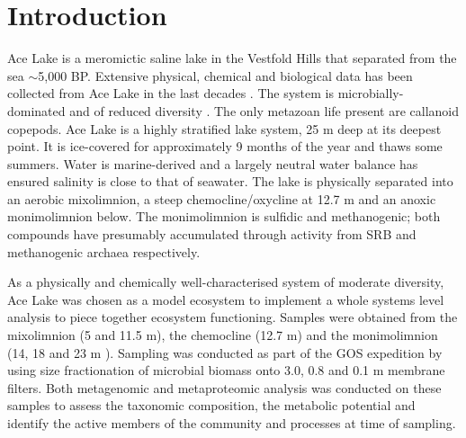 \section{Introduction}
Ace Lake is a meromictic saline lake in the Vestfold Hills that separated from the sea $\sim$5,000 BP. %
Extensive physical, chemical and biological data has been collected from Ace Lake in the last decades \cite{Rankin1999}.
The system is microbially-dominated and of reduced diversity \cite{Bowman2000a}.
The only metazoan life present are callanoid copepods. %
Ace Lake is a highly stratified lake system, 25 m deep at its deepest point.
It is ice-covered for approximately 9 months of the year and thaws some summers. %
Water is marine-derived and a largely neutral water balance has ensured salinity is close to that of seawater.
The lake is physically separated into an aerobic mixolimnion, a steep chemocline/oxycline at 12.7 m and an anoxic monimolimnion below.
The monimolimnion is sulfidic and methanogenic; both compounds have presumably accumulated through activity from \ac{SRB} and methanogenic archaea respectively.

As a physically and chemically well-characterised system of moderate diversity, Ace Lake was chosen as a model ecosystem to implement a whole systems level analysis to piece together ecosystem functioning.
Samples were obtained from the mixolimnion (5 and 11.5 m), the chemocline (12.7 m) and the monimolimnion (14, 18 and 23 m ).
Sampling was conducted as part of the \ac{GOS} expedition \cite{Rusch2007} by using size fractionation of microbial biomass onto 3.0, 0.8 and 0.1 \textmu{}m membrane filters.
Both metagenomic and metaproteomic analysis was conducted on these samples to assess the taxonomic composition, the metabolic potential and identify the active members of the community and processes at time of sampling.

